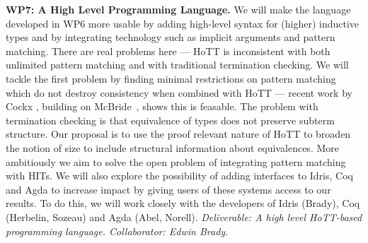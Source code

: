 \documentclass[a4paper,11pt]{article}
\begin{document}
{\bf WP7: A High Level Programming Language.} We will make the
language developed in WP6 more usable by adding high-level syntax for
(higher) inductive types and by integrating technology such as
implicit arguments and pattern matching. There are real problems here
--- HoTT is inconsistent with both unlimited pattern matching and with
traditional termination checking. We will tackle the first problem by
finding minimal restrictions on pattern matching which do not destroy
consistency when combined with HoTT --- recent work by Cockx
\cite{cockx-without-k}, building on McBride~\cite{viewftl}, shows this is feasable. 
The problem with termination checking is that equivalence of types
does not preserve subterm structure.
Our proposal is to use the proof relevant nature of
HoTT to broaden the notion of size to include structural
information about equivalences. More ambitiously we aim to
solve the open problem of integrating pattern
matching with HITs. We will also explore the possibility of adding
interfaces to Idris, Coq and
Agda to increase impact by giving users of these systems access to
our results. To do this, we will work closely 
with the developers of
Idris (Brady), Coq (Herbelin, Sozeau) and Agda (Abel, Norell). {\em Deliverable: A high level
  HoTT-based
programming language.  Collaborator: Edwin Brady.  
}




\end{document}
